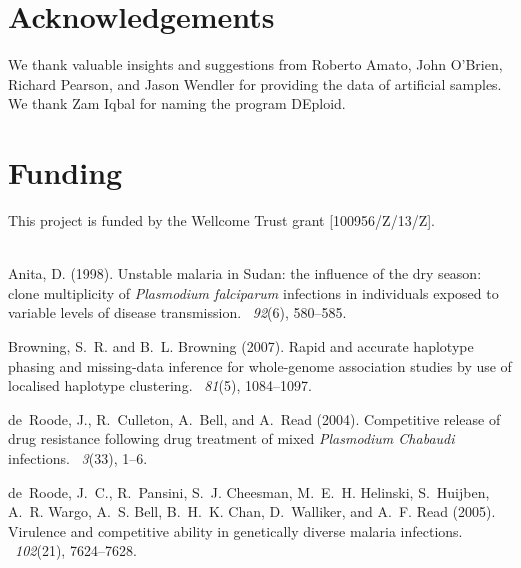 \documentclass{bioinfo}
\begin{document}
\section*{Acknowledgements}
We thank valuable insights and suggestions from Roberto Amato, John O'Brien, Richard Pearson, and Jason Wendler for providing the data of artificial samples. We thank Zam Iqbal for naming the program DEploid.

\section*{Funding}
This project is funded by the Wellcome Trust grant [100956/Z/13/Z].\\
~\\


\begin{thebibliography}{}

Anita, D. (1998).
\newblock Unstable malaria in Sudan: the influence of the dry season: clone
  multiplicity of {\it Plasmodium falciparum} infections in individuals exposed to
  variable levels of disease transmission.
~{\em 92\/}(6), 580--585.

Browning, S.~R. and B.~L. Browning (2007).
\newblock Rapid and accurate haplotype phasing and missing-data inference for
  whole-genome association studies by use of localised haplotype clustering.
~{\em 81\/}(5), 1084--1097.

de~Roode, J., R.~Culleton, A.~Bell, and A.~Read (2004).
\newblock Competitive release of drug resistance following drug treatment of
  mixed {\it Plasmodium Chabaudi} infections.
~{\em 3\/}(33), 1--6.

de~Roode, J.~C., R.~Pansini, S.~J. Cheesman, M.~E.~H. Helinski, S.~Huijben,
  A.~R. Wargo, A.~S. Bell, B.~H.~K. Chan, D.~Walliker, and A.~F. Read (2005).
\newblock Virulence and competitive ability in genetically diverse malaria
  infections.
~{\em 102\/}(21), 7624--7628.


\end{thebibliography}
\end{document}
